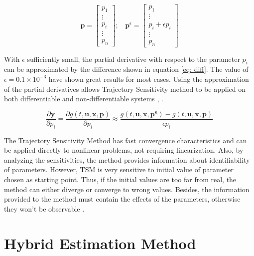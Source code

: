 \begin{equation}
	\mathbf{p} = 
	\begin{bmatrix}
		p_{1} \\
		\vdots \\
		p_{i} \\
		\vdots \\
		p_{n}
	\end{bmatrix}; \ \ \ \ 
	\mathbf{p}^{\epsilon} =
	\begin{bmatrix}
		p_{1} \\
		\vdots \\
		p_{i} + \epsilon p_{i} \\
		\vdots \\
		p_{n}
	\end{bmatrix}
	\label{eq: pvecs}
\end{equation}

With $\epsilon$ sufficiently small, the partial derivative with respect to the parameter $p_{i}$ can be approximated by the difference shown in equation \eqref{eq: diff}. The value of $\epsilon = 0.1 \times 10^{-3}$ have shown great results for most cases. Using the approximation of the partial derivatives allows Trajectory Sensitivity method to be applied on both differentiable and non-differentiable systems \cite{Benchluch1993}, \cite{Cari2006}.

\begin{equation}
	\frac{\partial\mathbf{y}}{\partial p_{i}} = 
	\frac{\partial g(t, \mathbf{u}, \mathbf{x}, \mathbf{p})}{\partial p_{i}} \approx 
	\frac{g(t, \mathbf{u}, \mathbf{x}, \mathbf{p^{\epsilon}}) - g(t, \mathbf{u}, \mathbf{x}, \mathbf{p})}{\epsilon p_{i}}
	\label{eq: diff}
\end{equation}

The Trajectory Sensitivity Method has fast convergence characteristics and can be applied directly to nonlinear problems, not requiring linearization. Also, by analyzing the sensitivities, the method provides information about identifiability of parameters. However, TSM is very sensitive to initial value of parameter chosen as starting point. Thus, if the initial values are too far from real, the method can either diverge or converge to wrong values. Besides, the information provided to the method must contain the effects of the parameters, otherwise they won't be observable \cite{Benchluch1993}.

\section{Hybrid Estimation Method}
\label{sec: Hybrid_Method}

